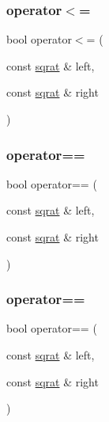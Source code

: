 \mbox{\label{classsqrat_ae33aee8490a3137fb967fbd52b100f6d}} 
\subsubsection{\texorpdfstring{operator$<$=}{operator<=}\hspace{0.1cm}{\footnotesize\ttfamily [3/3]}}
{\footnotesize\ttfamily bool operator$<$= (\begin{DoxyParamCaption}\item[{const \mbox{\hyperlink{classsqrat}{sqrat}} \&}]{left,  }\item[{const \mbox{\hyperlink{classsqrat}{sqrat}} \&}]{right }\end{DoxyParamCaption})\hspace{0.3cm}{\ttfamily [friend]}}

\mbox{\label{classsqrat_aa31a4a7298644b244db89e455265c946}} 
\subsubsection{\texorpdfstring{operator==}{operator==}\hspace{0.1cm}{\footnotesize\ttfamily [1/3]}}
{\footnotesize\ttfamily bool operator== (\begin{DoxyParamCaption}\item[{const \mbox{\hyperlink{classsqrat}{sqrat}} \&}]{left,  }\item[{const \mbox{\hyperlink{classsqrat}{sqrat}} \&}]{right }\end{DoxyParamCaption})\hspace{0.3cm}{\ttfamily [friend]}}

\mbox{\label{classsqrat_aa31a4a7298644b244db89e455265c946}} 
\subsubsection{\texorpdfstring{operator==}{operator==}\hspace{0.1cm}{\footnotesize\ttfamily [2/3]}}
{\footnotesize\ttfamily bool operator== (\begin{DoxyParamCaption}\item[{const \mbox{\hyperlink{classsqrat}{sqrat}} \&}]{left,  }\item[{const \mbox{\hyperlink{classsqrat}{sqrat}} \&}]{right }\end{DoxyParamCaption})\hspace{0.3cm}{\ttfamily [friend]}}

